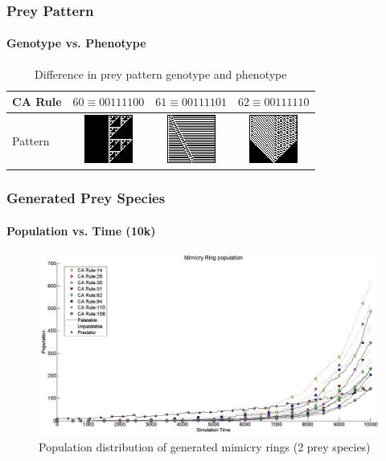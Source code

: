 \frame
{
	\frametitle{Prey Pattern}
	\framesubtitle{Genotype vs. Phenotype}

	\begin{table}
	\centering
	\begin{scriptsize}
	\begin{tabular}{|l|c|c|c|}
	  \hline
	  CA Rule & \(60 \equiv 00111100\) & \(61 \equiv 00111101\) & \(62 \equiv 00111110 \) \\ \hline
	  Pattern & \parbox[c]{2.1em}{\includegraphics[scale=0.30]{../tex/images/CARule60}} 
	  				& \parbox[c]{2.1em}{\includegraphics[scale=0.30]{../tex/images/CARule61}} 
	  				& \parbox[c]{2.1em}{\includegraphics[scale=0.30]{../tex/images/CARule62}}\\
	  \hline
	\end{tabular}
	\end{scriptsize}
	\caption{Difference in prey pattern genotype and phenotype}
	\label{tab:diff-in-pattern}
	\end{table}
}

\frame
{
	\frametitle{Generated Prey Species}
	\framesubtitle{Population vs. Time (10k)}
	
	\begin{figure}[H]
		\centering
		\includegraphics[scale=0.25]{../tex/images/simTime10k-2Prey-generated-prey}
		\caption{Population distribution of generated mimicry rings (2 prey species)}
		\label{fig:plot-2-prey-generated-prey}
	\end{figure}
}

